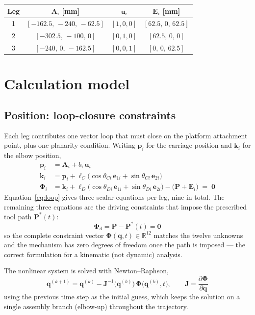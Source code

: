 \documentclass[11pt]{article}
\begin{document}
\begin{center}
\begin{tabular}{@{}cccc@{}}
\toprule
\textbf{Leg} & $\bm A_i$ [mm] & $\bm u_i$ & $\bm E_i$ [mm] \\
\midrule
1 & $[-162.5,\,-240,\,-62.5]$ & $[1,0,0]$ & $[62.5,\,0,\,62.5]$ \\
2 & $[-302.5,\,-100,\,0]$     & $[0,1,0]$ & $[62.5,\,0,\,0]$ \\
3 & $[-240,\,0,\,-162.5]$     & $[0,0,1]$ & $[0,\,0,\,62.5]$ \\
\bottomrule
\end{tabular}
\end{center}

\section{Calculation model}\label{sec:kin-model}

\subsection{Position: loop-closure constraints}

Each leg contributes one vector loop that must close on the platform attachment point,
plus one planarity condition. Writing $\bm p_i$ for the carriage position and
$\bm k_i$ for the elbow position,
\begin{align}
\bm p_i &= \bm A_i + b_i\,\bm u_i \\
\bm k_i &= \bm p_i + \ell_C\bigl(\cos\theta_{Ci}\,\bm e_{1i} + \sin\theta_{Ci}\,\bm e_{2i}\bigr) \\
\bm\Phi_i &= \bm k_i + \ell_D\bigl(\cos\theta_{Di}\,\bm e_{1i} + \sin\theta_{Di}\,\bm e_{2i}\bigr)
              - \bigl(\bm P + \bm E_i\bigr) \;=\; \bm 0
\label{eq:loop}
\end{align}
Equation~\eqref{eq:loop} gives three scalar equations per leg, nine in total. The
remaining three equations are the driving constraints that impose the prescribed tool
path $\bm P^{\ast}(t)$:
\begin{equation}
\bm\Phi_d = \bm P - \bm P^{\ast}(t) = \bm 0
\end{equation}
so the complete constraint vector $\bm\Phi(\bm q,t)\in\mathbb{R}^{12}$ matches the twelve
unknowns and the mechanism has zero degrees of freedom once the path is imposed --- the
correct formulation for a kinematic (not dynamic) analysis.

The nonlinear system is solved with Newton--Raphson,
\begin{equation}
\bm q^{(k+1)} = \bm q^{(k)} - \bm J^{-1}\bigl(\bm q^{(k)}\bigr)\,\bm\Phi\bigl(\bm q^{(k)},t\bigr),
\qquad
\bm J = \frac{\partial\bm\Phi}{\partial\bm q}
\end{equation}
using the previous time step as the initial guess, which keeps the solution on a single
assembly branch (elbow-up) throughout the trajectory.
\end{document}
